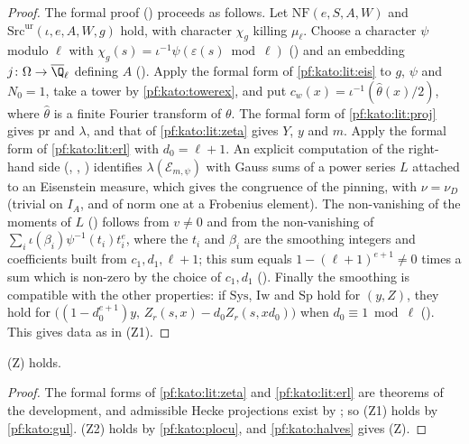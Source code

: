 \begin{proof}
The formal proof () proceeds as follows. Let $\mathrm{NF}(e,S,A,W)$ and
$\mathrm{Src}^{\mathrm{ur}}(\iota,e,A,W,g)$ hold, with character $\chi_g$ killing $\mu_\ell$. Choose a character $\psi$ modulo $\ell$
with $\chi_g(s)=\iota^{-1}\psi(\varepsilon(s)\bmod\ell)$ () and an embedding
$j\colon\Omega\to\katoQlb$ defining $A$ (). Apply the formal form of \cref{pf:kato:lit:eis}
to $g$, $\psi$ and $N_0=1$, take a tower by \cref{pf:kato:towerex}, and put $c_w(x)=\iota^{-1}(\hat\theta(x)/2)$, where $\hat\theta$ is a
finite Fourier transform of $\theta$. The formal form of \cref{pf:kato:lit:proj} gives $\mathrm{pr}$ and $\lambda$, and that of
\cref{pf:kato:lit:zeta} gives $Y$, $y$ and $m$. Apply the formal form of \cref{pf:kato:lit:erl} with $d_0=\ell+1$. An explicit computation
of the right-hand side (, ,
) identifies $\lambda(\mathcal E_{m,\psi})$ with Gauss sums of a power series $L$ attached to an
Eisenstein measure, which gives the congruence of the pinning, with $\nu=\nu_D$ (trivial on $I_A$, and of norm one at a Frobenius element).
The non-vanishing of the moments of $L$ () follows from $v\ne0$ and from the non-vanishing of
$\sum_i\iota(\beta_i)\psi^{-1}(t_i)t_i^e$, where the $t_i$ and $\beta_i$ are the smoothing integers and coefficients built from $c_1,d_1,\ell+1$;
this sum equals $1-(\ell+1)^{e+1}\ne0$ times a sum which is non-zero by the choice of $c_1,d_1$
(). Finally the smoothing is compatible with the other properties: if $\mathrm{Sys}$,
$\mathrm{Iw}$ and $\mathrm{Sp}$ hold for $(y,Z)$, they hold for $\bigl((1-d_0^{e+1})y,\,Z_r(s,x)-d_0Z_r(s,xd_0)\bigr)$ when $d_0\equiv1\bmod\ell$
(). This gives data as in \textup{(Z1)}.
\end{proof}

\begin{theorem}\label{pf:kato:zetaur}
\textup{(Z)} holds.
\end{theorem}

\begin{proof}
The formal forms of \cref{pf:kato:lit:zeta} and \cref{pf:kato:lit:erl} are theorems of the development, and admissible Hecke projections
exist by ; so \textup{(Z1)} holds by \cref{pf:kato:gul}.
\textup{(Z2)} holds by \cref{pf:kato:plocu}, and \cref{pf:kato:halves} gives \textup{(Z)}.
\end{proof}

